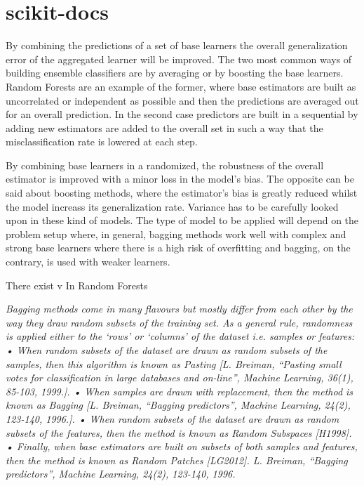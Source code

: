 \section{scikit-docs}

By combining the predictions of a set of base learners the overall generalization error of the aggregated learner will be improved. The two most common ways of building ensemble classifiers are by averaging or by boosting the base learners. Random Forests are an example of the former, where base estimators are built as uncorrelated or independent as possible and then the predictions are averaged out for an overall prediction. In the second case predictors are built in a sequential by adding new estimators are added to the overall set in such a way that the misclassification rate is lowered at each step.

By combining base learners in a randomized, the robustness of the overall estimator is improved with a minor loss in the model's bias. The opposite can be said about boosting methods, where the estimator's bias is greatly reduced whilst the model increass its generalization rate. Variance has to be carefully looked upon in these kind of models. The type of model to be applied will depend on the problem setup where, in general, bagging methods work well with complex and strong base learners where there is a high risk of overfitting and bagging, on the contrary, is used with weaker learners.

There exist v In Random Forests 

\textit{Bagging methods come in many flavours but mostly differ from each other by the way they draw random subsets of the training set. As a general rule, randomness is applied either to the ‘rows’ or ‘columns’ of the dataset i.e. samples or features:    
• When random subsets of the dataset are drawn as random subsets of the samples, then this algorithm is known as Pasting [L. Breiman, “Pasting small votes for classification in large databases and on-line”, Machine Learning, 36(1), 85-103, 1999.].
• When samples are drawn with replacement, then the method is known as Bagging [L. Breiman, “Bagging predictors”, Machine Learning, 24(2), 123-140, 1996.].
• When random subsets of the dataset are drawn as random subsets of the features, then the method is known as Random Subspaces [H1998].
• Finally, when base estimators are built on subsets of both samples and features, then the method is known as
Random Patches [LG2012].
L. Breiman, “Bagging predictors”, Machine Learning, 24(2), 123-140, 1996.}

